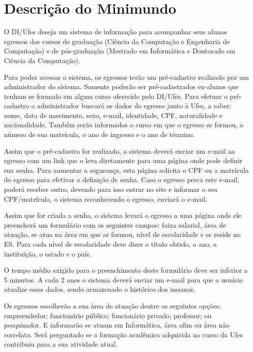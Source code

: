 
\chapter{Descrição do Minimundo}
\label{sec-minimundo}

O DI/Ufes deseja um sistema de informação para acompanhar seus alunos egressos dos cursos de graduação (Ciência da Computação e Engenharia de Computação) e de pós-graduação (Mestrado em Informática e Doutorado em Ciência da Computação). 

Para poder acessar o sistema, os egressos terão um pré-cadastro realizado por um administrador do sistema. Somente poderão ser pré-cadastrados ex-alunos que tenham se formado em algum curso oferecido pelo DI/Ufes. Para efetuar o pré-cadastro o administrador buscará os dados do egresso junto à Ufes, a saber: nome, data de nascimento, sexo, e-mail, identidade, CPF, naturalidade e nacionalidade. Também serão informados o curso em que o egresso se formou, o número de sua matrícula, o ano de ingresso e o ano de término. 

Assim que o pré-cadastro for realizado, o sistema deverá enviar um e-mail ao egresso com um link que o leva diretamente para uma página onde pode definir sua senha. Para aumentar a segurança, esta página solicita o CPF ou a matrícula do egresso para efetivar a definição de senha. Caso o egresso perca este e-mail, poderá receber outro, devendo para isso entrar no site e informar o seu CPF/matrícula, o sistema reconhecendo o egresso, enviará o e-mail.
 
Assim que for criada a senha, o sistema levará o egresso a uma página onde ele preencherá um formulário com os seguintes campos: faixa salarial, área de atuação, se atua na área em que se formou, nível de escolaridade e se reside no ES. Para cada nível de escolaridade deve dizer o título obtido, o ano, a instituição, o estado e o país.

O tempo médio exigido para o preenchimento deste formulário deve ser inferior a 5 minutos. A cada 2 anos o sistema deverá enviar um e-mail para que o usuário atualize esses dados, sendo armazenado o histórico dos mesmos.

Os egressos escolherão a sua área de atuação dentre as seguintes opções: empreendedor; funcionário público; funcionário privado; professor; ou pesquisador. E informarão se atuam em Informática, área afim ou área não correlata. Será perguntado se a formação acadêmica adquirida no curso da Ufes contribuiu para a sua atividade atual.

